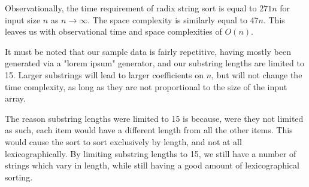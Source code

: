 \documentclass[12pt]{amsart}
\begin{document}
    Observationally, the time requirement of radix string sort
    is equal to $271n$ for input size $n$ as $n \to \infty$. The
    space complexity is similarly equal to $47n$. This leaves
    us with observational time and space complexities of $O(n)$.

    It must be noted that our sample data is fairly repetitive,
    having mostly been generated via a "lorem ipsum" generator,
    and our substring lengths are limited to 15. Larger
    substrings will lead to larger coefficients on $n$, but will
    not change the time complexity, as long as they are not
    proportional to the size of the input array.

    The reason substring lengths were limited to 15 is because,
    were they not limited as such, each item would have a
    different length from all the other items. This would cause
    the sort to sort exclusively by length, and not at all
    lexicographically. By limiting substring lengths to 15, we
    still have a number of strings which vary in length, while
    still having a good amount of lexicographical sorting.
\end{document}
